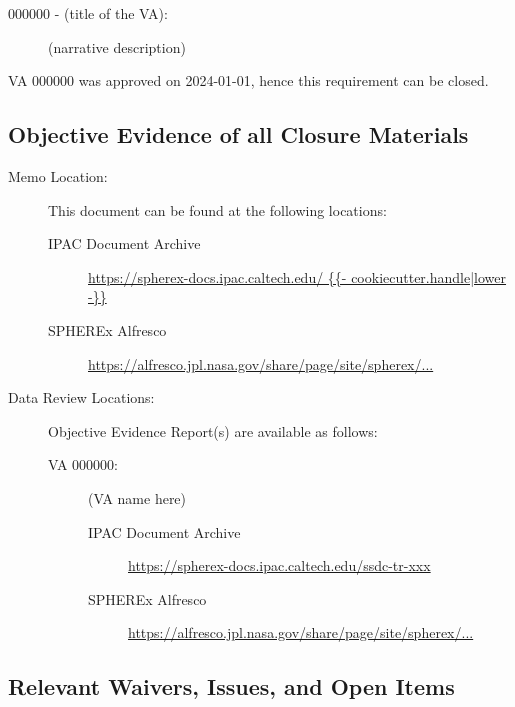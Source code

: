 \documentclass[TR]{spherex}
\begin{document}
\begin{small}

\begin{description}
  \item[000000 - (title of the VA):] (narrative description)
\end{description}

\noindent VA 000000 was approved on 2024-01-01, hence this requirement can be closed.


\subsection*{Objective Evidence of all Closure Materials}


\begin{description}
  \item[Memo Location:] This document can be found at the following locations:
    \begin{description}
      \item[IPAC Document Archive] \url{https://spherex-docs.ipac.caltech.edu/ {{- cookiecutter.handle|lower -}} }
      \item[SPHEREx Alfresco] \url{https://alfresco.jpl.nasa.gov/share/page/site/spherex/...}
    \end{description}
  \item[Data Review Locations:] Objective Evidence Report(s) are available as follows:
    \begin{description}
      \item[VA 000000:] (VA name here)
        \begin{description}
          \item[IPAC Document Archive] \url{https://spherex-docs.ipac.caltech.edu/ssdc-tr-xxx}
          \item[SPHEREx Alfresco] \url{https://alfresco.jpl.nasa.gov/share/page/site/spherex/...}
        \end{description}
    \end{description}
\end{description}


\subsection*{Relevant Waivers, Issues, and Open Items}


\end{small}
\end{document}
